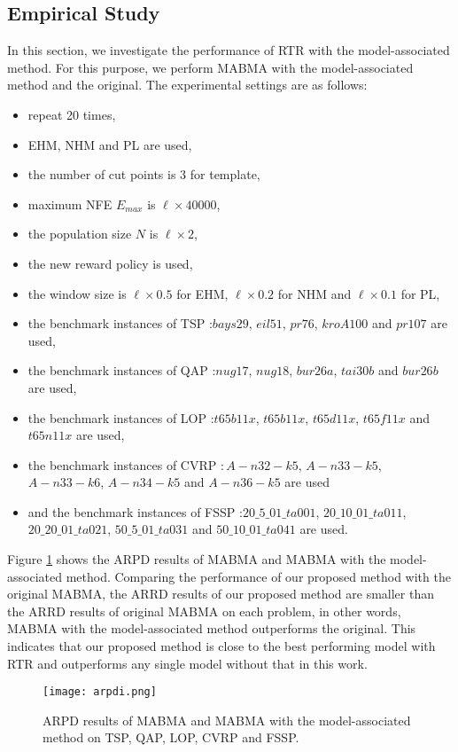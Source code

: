 \subsection{Empirical Study}
In this section, we investigate the performance of RTR with the model-associated method. For this purpose, we perform MABMA with the model-associated method and the original. The experimental settings are as follows:
\begin{itemize}
    \item repeat 20 times,
    \item EHM, NHM and PL are used,
    \item the number of cut points is 3 for template,
    \item maximum NFE $E_{max}$ is $\ell \times 40000$,
    \item the population size $N$ is $\ell \times 2$,
    \item the new reward policy is used,
    \item the window size is $\ell\times 0.5$ for EHM, $\ell\times 0.2$ for NHM and $\ell\times 0.1$ for PL,
    \item the benchmark instances of TSP :$bays29$, $eil51$, $pr76$, $kroA100$ and $pr107$ are used,
    \item the benchmark instances of QAP :$nug17$, $nug18$, $bur26a$, $ tai30b$ and $bur26b$ are used,
    \item the benchmark instances of LOP :$t65b11x$, $t65b11x$, $t65d11x$, $t65f11x$ and $t65n11x$ are used,
    \item the benchmark instances of CVRP $:A-n32-k5$, $A-n33-k5$, $A-n33-k6$, $A-n34-k5$ and $A-n36-k5$ are used
    \item and the benchmark instances of FSSP :$20\_5\_01\_ta001$, $20\_10\_01\_ta011$, $20\_20\_01\_ta021$, $50\_5\_01\_ta031$ and $50\_10\_01\_ta041$ are used.
\end{itemize}

Figure \ref{fig:arpdi} shows the ARPD results of MABMA and MABMA with the model-associated method. Comparing the performance of our proposed method with the original MABMA, the ARRD results of our proposed method are smaller than the ARRD results of original MABMA on each problem, in other words, MABMA with the model-associated method outperforms the original. This indicates that our proposed method is close to the best performing model with RTR and outperforms any single model without that in this work.

\begin{figure}[htbp] 
        \centering
        \texttt{[image: arpdi.png]}
        \caption{ ARPD results of MABMA and MABMA with the model-associated method on TSP, QAP, LOP, CVRP and FSSP. } 
        \label{fig:arpdi}
\end{figure}


